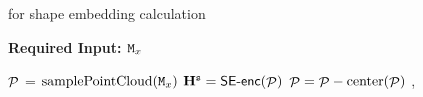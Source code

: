 \begin{algorithm}[!h]
    \caption{\SEE for shape embedding calculation}
    \label{alg:see_shaperep}
    \textbf{Required Input: $\molx$}
    \begin{algorithmic}[1]
        \State $\pc$ = $\text{samplePointCloud}(\molx)$
        \State $\shapehiddenmat = \SEE(\pc)$
        \State $\pc = \pc - \text{center}(\pc)$
        \State \Return \shapehiddenmat, \pc
    \end{algorithmic}
\end{algorithm}